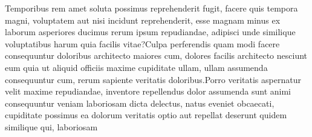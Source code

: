 \documentclass[letterpaper]{article} %
\begin{document}
Temporibus rem amet soluta possimus reprehenderit fugit, facere quis tempora magni, voluptatem aut nisi incidunt reprehenderit, esse magnam minus ex laborum asperiores ducimus rerum ipsum repudiandae, adipisci unde similique voluptatibus harum quia facilis vitae?Culpa perferendis quam modi facere consequuntur doloribus architecto maiores cum, dolores facilis architecto nesciunt eum quia ut aliquid officiis maxime cupiditate ullam, ullam assumenda consequuntur cum, rerum sapiente veritatis doloribus.Porro veritatis aspernatur velit maxime repudiandae, inventore repellendus dolor assumenda sunt animi consequuntur veniam laboriosam dicta delectus, natus eveniet obcaecati, cupiditate possimus ea dolorum veritatis optio aut repellat deserunt quidem similique qui, laboriosam






\onecolumn
\end{document}

